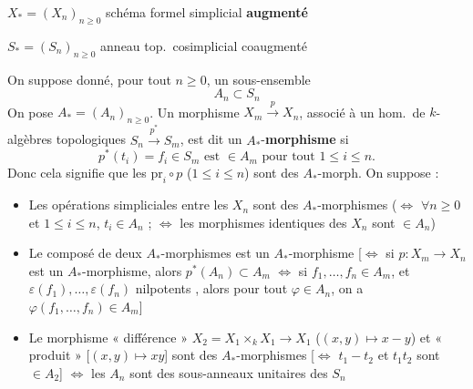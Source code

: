 \documentclass[11pt,a4paper]{article}
\begin{document}
$X_* = (X_n)_{n \geq 0}$ \quad schéma formel simplicial \textbf{augmenté}

$S_* = (S_n)_{n \geq 0}$ \quad anneau top.\ cosimplicial coaugmenté

On suppose donné, pour tout $n \geq 0$, un sous-ensemble
\[
  A_n \subset S_n
\]
On pose $A_* = (A_n)_{n \geq 0}$. Un morphisme $X_m \xrightarrow{p} X_n$,
associé à un hom.\ de $k$-algèbres topologiques $S_n \xrightarrow{p^*} S_m$, est
dit un $A_*$-\textbf{morphisme} si
\[
  p^*(t_i) = f_i \in S_m \text{ est } \in A_m \text{ pour tout } 1 \leq i \leq n .
\]
Donc cela signifie que les $\mathrm{pr}_i \circ p$ ($1 \leq i \leq n$) sont des
$A_*$-morph. On suppose :


\begin{itemize}
  \item[(a)]  Les opérations simpliciales entre les $X_n$
    sont des $A_*$-morphismes ($\Leftrightarrow$ $\forall n \geq 0$ et
    $1 \leq i \leq n$, $t_i \in A_n$ ; $\Leftrightarrow$ les morphismes
    identiques des $X_n$ sont $\in A_n$)
  \item[(b)]  Le composé de deux $A_*$-morphismes est un
    $A_*$-morphisme [$\Leftrightarrow$ si $p : X_m \to X_n$ est un
    $A_*$-morphisme, alors $p^*(A_n) \subset A_m$ $\Leftrightarrow$ si
    $f_1, \ldots, f_n \in A_m$, et $\varepsilon(f_1), \ldots, \varepsilon(f_n)$
    nilpotents , alors pour tout
    $\varphi \in A_n$, on a $\varphi(f_1, \ldots, f_n) \in A_m$]
  \item[(c)]  Le morphisme « différence »
    $X_2 = X_1 \times_k X_1 \to X_1$ ($(x, y) \mapsto x - y$) et « produit »
    [$(x, y) \mapsto xy$] sont des $A_*$-morphismes
    [$\Leftrightarrow$ $t_1 - t_2$ et $t_1 t_2$ sont $\in A_2$]
     $\Leftrightarrow$ les $A_n$ sont 
    des sous-anneaux unitaires des $S_n$
\end{itemize}

\end{document}

